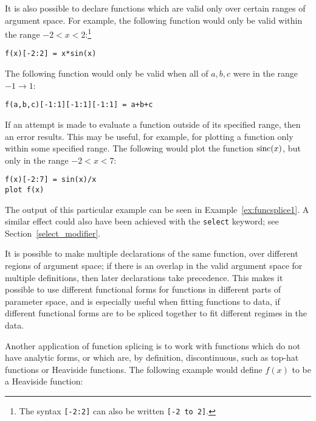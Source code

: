 \noindent It is also possible to declare functions which are valid only over
certain ranges of argument space. For example, the following function would
only be valid within the range $-2<x<2$:\footnote{The syntax {\tt [-2:2]} can
also be written {\tt [-2 to 2]}.}

\begin{verbatim}
f(x)[-2:2] = x*sin(x)
\end{verbatim}

\noindent The following function would only be valid when all of ${a,b,c}$ were
in the range $-1 \to 1$:

\begin{verbatim}
f(a,b,c)[-1:1][-1:1][-1:1] = a+b+c
\end{verbatim}

If an attempt is made to evaluate a function outside of its specified range,
then an error results. This may be useful, for example, for plotting a function
only within some specified range. The following would plot the function
${\rm sinc}(x)$, but only in the range $-2<x<7$:

\begin{verbatim}
f(x)[-2:7] = sin(x)/x
plot f(x)
\end{verbatim}


\label{splice} \noindent The output of this particular example can be seen in
Example~\ref{ex:funcsplice1}. A similar effect could also have been achieved
with the {\tt select} keyword; see Section~\ref{select_modifier}.

It is possible to make multiple declarations of the same function, over
different regions of argument space; if there is an overlap in the valid
argument space for multiple definitions, then later declarations take
precedence. This makes it possible to use different functional forms for
functions in different parts of parameter space, and is especially useful when
fitting functions to data, if different functional forms are to be spliced
together to fit different regimes in the data.

Another application of function splicing is to work with functions which do not
have analytic forms, or which are, by definition, discontinuous, such as
top-hat functions or Heaviside functions. The following example would define
$f(x)$ to be a Heaviside function:

